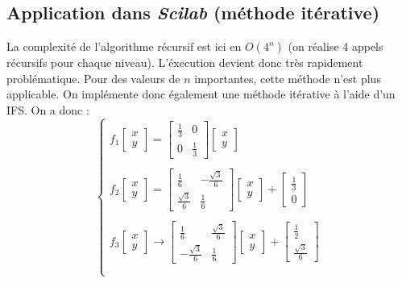 \documentclass[a4paper,10pt]{report}
\begin{document}
\subsection{Application dans \textit{Scilab} (méthode itérative)}
La complexité de l'algorithme récursif est ici en $O(4^n)$ (on réalise 4 appels récursifs pour chaque niveau). L'éxecution devient donc très rapidement problématique. Pour des valeurs de $n$ importantes, cette méthode n'est plus applicable. On implémente donc également une méthode itérative à l'aide d'un IFS. On a donc :
\begin{equation}
\left\lbrace
\begin{array}{l}
f_1 \left[ \begin{array}{l} x \\ y \end{array} \right] =
\left[ \begin{array}{ll} \frac{1}{3} & 0 \\ 0 & \frac{1}{3} \end{array} \right]
\left[ \begin{array}{l} x \\ y \end{array} \right]\\ \\

f_2 \left[ \begin{array}{l} x \\ y \end{array} \right] =
\left[ \begin{array}{ll} \frac{1}{6} & -\frac{\sqrt{3}}{6} \\ \frac{\sqrt{3}}{6} & \frac{1}{6} \end{array} \right]
\left[ \begin{array}{ll} x \\ y \end{array} \right]
+ \left[ \begin{array}{l} \frac{1}{3} \\ 0 \end{array} \right]\\ \\

f_3 \left[ \begin{array}{l} x \\ y \end{array} \right] \longrightarrow
\left[ \begin{array}{ll} \frac{1}{6} & \frac{\sqrt{3}}{6} \\ -\frac{\sqrt{3}}{6} & \frac{1}{6} \end{array} \right]
\left[ \begin{array}{ll} x \\ y \end{array} \right]
+ \left[ \begin{array}{l} \frac{1}{2} \\ \frac{\sqrt{3}}{6} \end{array} \right]\\ \\


\end{array}
\end{equation}
\end{document}
